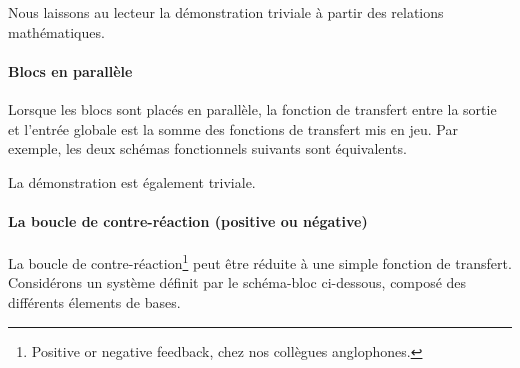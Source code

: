 \begin{center}

\end{center}

\begin{center}

\end{center}

Nous laissons au lecteur la démonstration triviale à partir des relations 
mathématiques.


\paragraph{Blocs en parallèle} 

Lorsque les blocs sont placés en parallèle, la fonction de transfert 
entre la sortie et l'entrée globale est la somme des fonctions de transfert 
mis en jeu. Par exemple, les deux schémas fonctionnels suivants 
sont équivalents.

\begin{center}
    
\end{center}

\begin{center}
    
\end{center}

La démonstration est également triviale.

\paragraph{La boucle de contre-réaction (positive ou négative)
          \label{sec-boucle}}

La boucle de contre-réaction\footnote{\og Positive or negative feedback\fg, 
chez nos collègues anglophones.} peut être réduite à une simple fonction 
de transfert. Considérons un système définit par le schéma-bloc ci-dessous, 
composé des différents élements de bases.

